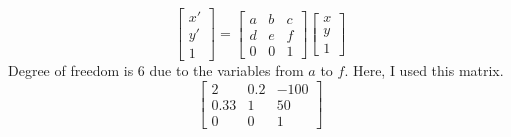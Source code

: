 \documentclass{article}
\begin{document}
$$ \begin{bmatrix}
    x' \\ y' \\ 1
    \end{bmatrix}
    =
    \begin{bmatrix}
    a & b & c \\
    d & e & f \\
    0 & 0 & 1
    \end{bmatrix}
    \begin{bmatrix}
    x \\ y \\ 1
\end{bmatrix} $$
Degree of freedom is 6 due to the variables from $a$ to $f$.
Here, I used this matrix.
$$ 
\begin{bmatrix}
    2 & 0.2 & -100 \\
    0.33 & 1 & 50 \\
    0 & 0 & 1
\end{bmatrix} 
$$
\end{document}
